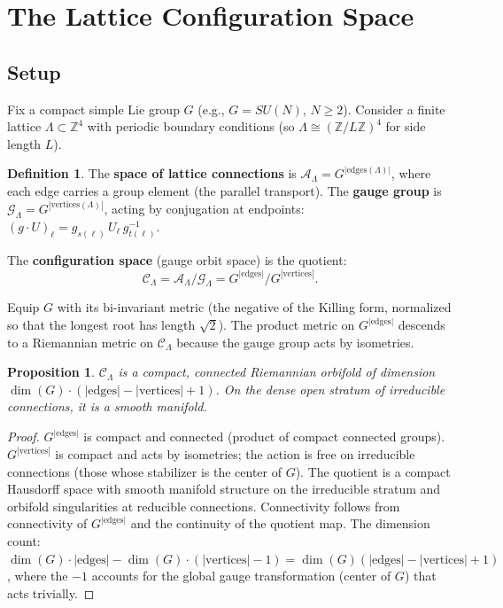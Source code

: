 \documentclass[11pt]{article}
\newtheorem{proposition}[theorem]{Proposition}
\theoremstyle{definition}
\newtheorem{definition}[theorem]{Definition}
\newcommand{\calA}{\mathcal{A}}
\newcommand{\calG}{\mathcal{G}}
\newcommand{\calC}{\mathcal{C}}
\newcommand{\Z}{\mathbb{Z}}
\begin{document}
\section{The Lattice Configuration Space}
\label{sec:lattice}

\subsection{Setup}

Fix a compact simple Lie group $G$ (e.g., $G = SU(N)$, $N \geq 2$). Consider a finite lattice $\Lambda \subset \Z^4$ with periodic boundary conditions (so $\Lambda \cong (\Z/L\Z)^4$ for side length $L$).

\begin{definition}
The \textbf{space of lattice connections} is $\calA_\Lambda = G^{|\text{edges}(\Lambda)|}$, where each edge carries a group element (the parallel transport). The \textbf{gauge group} is $\calG_\Lambda = G^{|\text{vertices}(\Lambda)|}$, acting by conjugation at endpoints: $(g \cdot U)_\ell = g_{s(\ell)}\, U_\ell\, g_{t(\ell)}^{-1}$.

The \textbf{configuration space} (gauge orbit space) is the quotient:
\begin{equation}
    \calC_\Lambda = \calA_\Lambda / \calG_\Lambda = G^{|\text{edges}|} / G^{|\text{vertices}|}.
\end{equation}
\end{definition}

Equip $G$ with its bi-invariant metric (the negative of the Killing form, normalized so that the longest root has length $\sqrt{2}$). The product metric on $G^{|\text{edges}|}$ descends to a Riemannian metric on $\calC_\Lambda$ because the gauge group acts by isometries.

\begin{proposition}\label{prop:compact-connected}
$\calC_\Lambda$ is a compact, connected Riemannian orbifold of dimension $\dim(G) \cdot (|\text{edges}| - |\text{vertices}| + 1)$. On the dense open stratum of irreducible connections, it is a smooth manifold.
\end{proposition}

\begin{proof}
$G^{|\text{edges}|}$ is compact and connected (product of compact connected groups). $G^{|\text{vertices}|}$ is compact and acts by isometries; the action is free on irreducible connections (those whose stabilizer is the center of $G$). The quotient is a compact Hausdorff space with smooth manifold structure on the irreducible stratum and orbifold singularities at reducible connections. Connectivity follows from connectivity of $G^{|\text{edges}|}$ and the continuity of the quotient map. The dimension count: $\dim(G) \cdot |\text{edges}| - \dim(G) \cdot (|\text{vertices}| - 1) = \dim(G)(|\text{edges}| - |\text{vertices}| + 1)$, where the $-1$ accounts for the global gauge transformation (center of $G$) that acts trivially.
\end{proof}
\end{document}
